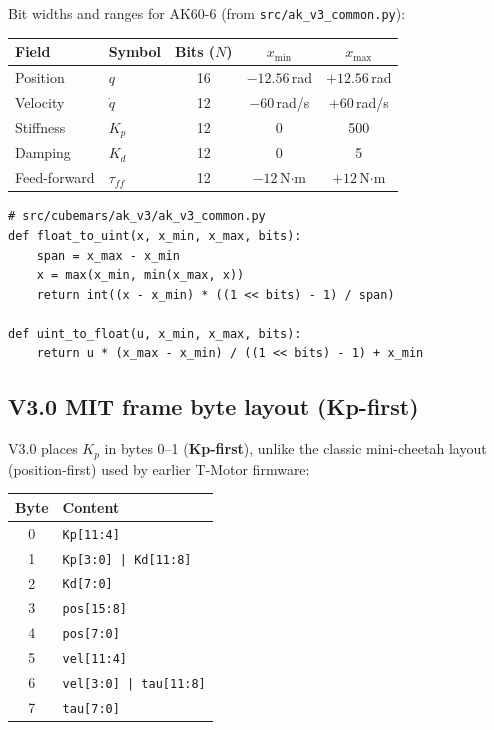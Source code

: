 \documentclass[11pt,a4paper]{article}
\begin{document}
Bit widths and ranges for AK60-6 (from \texttt{src/ak\_v3\_common.py}):

\begin{center}\small
\begin{tabular}{llccc}
\toprule
Field & Symbol & Bits ($N$) & $x_{\min}$ & $x_{\max}$ \\
\midrule
Position      & $q$         & 16 & $-12.56$\,rad & $+12.56$\,rad \\
Velocity      & $\dot{q}$   & 12 & $-60$\,rad/s  & $+60$\,rad/s  \\
Stiffness     & $K_p$       & 12 & 0             & 500           \\
Damping       & $K_d$       & 12 & 0             & 5             \\
Feed-forward  & $\tau_{ff}$ & 12 & $-12$\,N$\cdot$m & $+12$\,N$\cdot$m \\
\bottomrule
\end{tabular}
\end{center}

\begin{lstlisting}
# src/cubemars/ak_v3/ak_v3_common.py
def float_to_uint(x, x_min, x_max, bits):
    span = x_max - x_min
    x = max(x_min, min(x_max, x))
    return int((x - x_min) * ((1 << bits) - 1) / span)

def uint_to_float(u, x_min, x_max, bits):
    return u * (x_max - x_min) / ((1 << bits) - 1) + x_min
\end{lstlisting}

\subsection{V3.0 MIT frame byte layout (Kp-first)}

V3.0 places $K_p$ in bytes 0--1 (\textbf{Kp-first}), unlike the classic
mini-cheetah layout (position-first) used by earlier T-Motor firmware:

\begin{center}\small
\begin{tabular}{cl}
\toprule
Byte & Content \\
\midrule
0 & \texttt{Kp[11:4]} \\
1 & \texttt{Kp[3:0] | Kd[11:8]} \\
2 & \texttt{Kd[7:0]} \\
3 & \texttt{pos[15:8]} \\
4 & \texttt{pos[7:0]} \\
5 & \texttt{vel[11:4]} \\
6 & \texttt{vel[3:0] | tau[11:8]} \\
7 & \texttt{tau[7:0]} \\
\bottomrule
\end{tabular}
\end{center}
\end{document}

